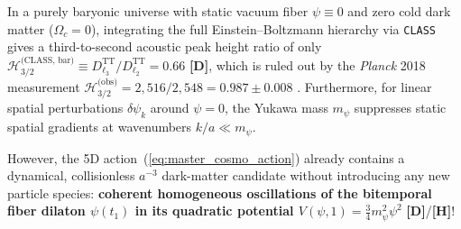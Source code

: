 \documentclass[11pt,a4paper]{article}
\newcommand{\catD}{\textbf{\textcolor{blue!75!black}{[D]}}}
\newcommand{\catH}{\textbf{\textcolor{orange!85!black}{[H]}}}
\theoremstyle{plain}
\theoremstyle{definition}
\theoremstyle{remark}
\numberwithin{equation}{section}
\begin{document}
In a purely baryonic universe with static vacuum fiber $\psi \equiv 0$ and zero cold dark matter ($\Omega_c = 0$), integrating the full Einstein--Boltzmann hierarchy via \texttt{CLASS} gives a third-to-second acoustic peak height ratio of only $\mathcal{H}_{3/2}^{\text{(CLASS, bar)}} \equiv D_{\ell_3}^{\text{TT}}/D_{\ell_2}^{\text{TT}} = \mathbf{0.66}$ \catD, which is ruled out by the \textit{Planck} 2018 measurement $\mathcal{H}_{3/2}^{\text{(obs)}} = 2{,}516 / 2{,}548 = \mathbf{0.987 \pm 0.008}$ \cite{planck2018_vi}. Furthermore, for linear spatial perturbations $\delta\psi_k$ around $\psi = 0$, the Yukawa mass $m_{\psi}$ suppresses static spatial gradients at wavenumbers $k/a \ll m_{\psi}$.

However, the 5D action~(\ref{eq:master_cosmo_action}) already contains a dynamical, collisionless $a^{-3}$ dark-matter candidate without introducing any new particle species: \textbf{coherent homogeneous oscillations of the bitemporal fiber dilaton $\psi(t_1)$ in its quadratic potential $V(\psi, 1) = \frac{3}{4}m_{\psi}^2\psi^2$} \catD/\catH!
\end{document}
